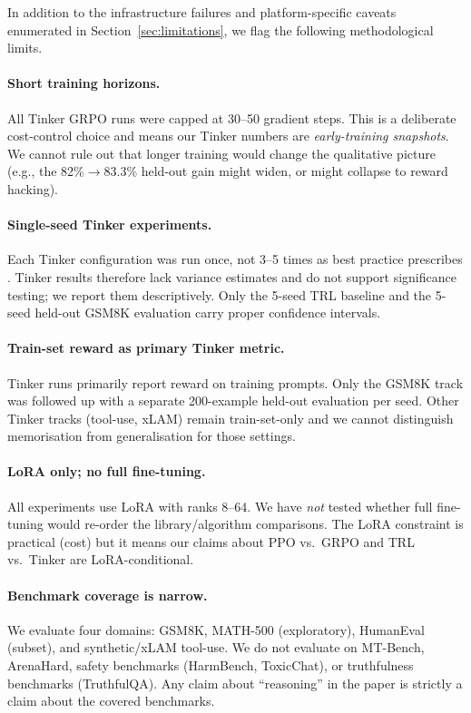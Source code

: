 \documentclass{article}
\begin{document}
In addition to the infrastructure failures and platform-specific caveats
enumerated in Section~\ref{sec:limitations}, we flag the following
methodological limits.

\paragraph{Short training horizons.}
All Tinker GRPO runs were capped at 30--50 gradient steps. This is a
deliberate cost-control choice and means our Tinker numbers are
\emph{early-training snapshots}. We cannot rule out that longer training
would change the qualitative picture (e.g., the 82\%$\to$83.3\% held-out
gain might widen, or might collapse to reward hacking).

\paragraph{Single-seed Tinker experiments.}
Each Tinker configuration was run once, not 3--5 times as best practice
prescribes \cite{henderson2018deep}. Tinker results therefore lack
variance estimates and do not support significance testing; we report
them descriptively. Only the 5-seed TRL baseline and the 5-seed held-out
GSM8K evaluation carry proper confidence intervals.

\paragraph{Train-set reward as primary Tinker metric.}
Tinker runs primarily report reward on training prompts. Only the GSM8K
track was followed up with a separate 200-example held-out evaluation
per seed. Other Tinker tracks (tool-use, xLAM) remain train-set-only and
we cannot distinguish memorisation from generalisation for those
settings.

\paragraph{LoRA only; no full fine-tuning.}
All experiments use LoRA \cite{hu2022lora} with ranks 8--64. We have
\emph{not} tested whether full fine-tuning would re-order the
library/algorithm comparisons. The LoRA constraint is practical (cost) but
it means our claims about PPO vs.\ GRPO and TRL vs.\ Tinker are
LoRA-conditional.

\paragraph{Benchmark coverage is narrow.}
We evaluate four domains: GSM8K, MATH-500 (exploratory), HumanEval
(subset), and synthetic/xLAM tool-use. We do not evaluate on MT-Bench,
ArenaHard, safety benchmarks (HarmBench, ToxicChat), or truthfulness
benchmarks (TruthfulQA). Any claim about ``reasoning'' in the paper is
strictly a claim about the covered benchmarks.
\end{document}
